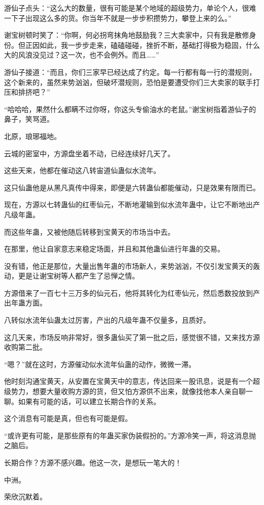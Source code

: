 \begin{this_body}
游仙子点头：“这么大的数量，很有可能是某个地域的超级势力，单论个人，很难一下子出现这么多的货。你当年不就是一步步积攒势力，攀登上来的么。”

谢宝树顿时笑了：“你啊，何必拐弯抹角地鼓励我？三大卖家中，只有我是散修身份。但正因如此，我一步步走来，磕磕碰碰，挫折不断，基础打得极为稳固，什么大的风浪没见过？这一次，也不会例外。而且……”

游仙子接道：“而且，你们三家早已经达成了约定。每一行都有每一行的潜规则，这个新来的，虽然来势汹汹，但破坏潜规则，恐怕是要遭受你们三大卖家的联手打压和排挤吧？”

“哈哈哈，果然什么都瞒不过你呀，你这头专偷油水的老鼠。”谢宝树指着游仙子的鼻子，笑骂道。

北原，琅琊福地。

云城的密室中，方源盘坐着不动，已经连续好几天了。

这些天来，他都在催动这八转宙道仙蛊似水流年。

这只仙蛊他是从黑凡真传中得来，即便是六转蛊仙都能催动，只是效果有限而已。

现在，方源以七转蛊仙的红枣仙元，不断地灌输到似水流年蛊中，让它不断地出产凡级年蛊。

而这些年蛊，又被他随后转移到宝黄天的市场当中去。

在那里，他让自家意志来稳定场面，并且和其他蛊仙进行年蛊的交易。

没有错，他正是那位，大量出售年蛊的市场新人，来势汹汹，不仅引发宝黄天的轰动，更是让谢宝树等人都产生了忌惮之情。

方源借来了一百七十三万多的仙元石，他将其转化为红枣仙元，然后悉数投放到产出年蛊方面。

八转似水流年仙蛊太过厉害，产出的凡级年蛊不仅量多，且质好。

这几天来，市场反响非常好，很多蛊仙买了第一批之后，感觉很不错，又来找方源收购第二批。

“嗯？”就在这时，方源催动似水流年仙蛊的动作，微微一滞。

他时刻沟通宝黄天，从安置在宝黄天中的意志，传达回来一股讯息，说是有一个超级势力，想要大量收购方源的货，但又怕方源供不出来，就像找他本人亲自聊一聊。如果有可能的话，可以建立长期合作的关系。

这个消息有可能是真，但也有可能是假。

“或许更有可能，是那些原有的年蛊买家伪装假扮的。”方源冷笑一声，将这消息抛之脑后。

长期合作？方源不感兴趣。他这一次，是想玩一笔大的！

中洲。

荣欣沉默着。


\end{this_body}
